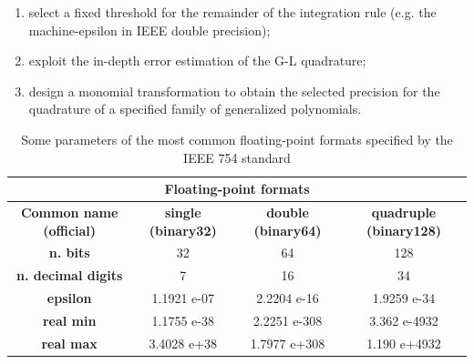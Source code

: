 \documentclass[a4paper, twosided]{book}
\begin{document}
\begin{enumerate}
    \item select a fixed threshold for the remainder of the integration rule (e.g. the machine-epsilon in IEEE double precision);
    \item exploit the in-depth error estimation of the G-L quadrature;
    \item design a monomial transformation to obtain the selected precision for the quadrature of a specified family of generalized polynomials.
\end{enumerate}

\begin{table}[H]
\centering
\begin{tabular}{|c||c|c|c|}
\hline
\multicolumn{4}{|c|}{\textbf{Floating-point formats}} \\
\hline
\textbf{Common name (official)} & \textbf{single (binary32)} & \textbf{double (binary64)} & \textbf{quadruple (binary128)} \\
\hline
\textbf{n. bits}                & 32          & 64           & 128          \\
\textbf{n. decimal digits}      & 7           & 16           & 34           \\
\textbf{epsilon}                & 1.1921 e-07 & 2.2204 e-16  & 1.9259 e-34  \\
\textbf{real min}                    & 1.1755 e-38 & 2.2251 e-308 & 3.362 e-4932 \\
\textbf{real max}                    & 3.4028 e+38 & 1.7977 e+308 & 1.190 e+4932 \\
\hline
\end{tabular}
  \caption{Some parameters of the most common floating-point formats specified by the IEEE 754 standard}
  \label{table1.1}
\end{table}
\end{document}
